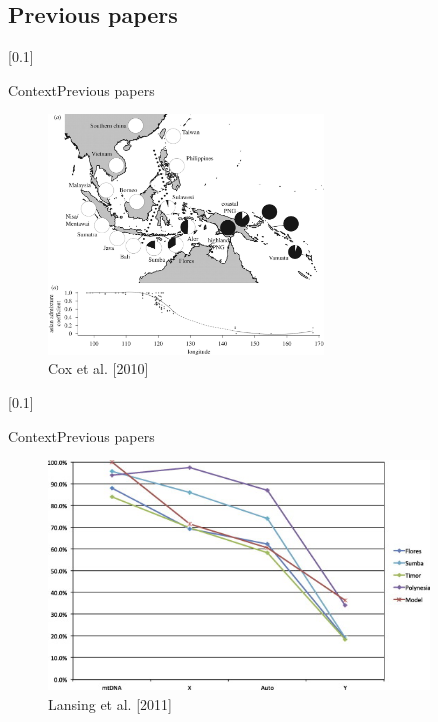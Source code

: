\documentclass[10pt, aspectratio=43]{beamer}
\begin{document}
\subsection{Previous papers}
[0.1]{}{}{}
\begin{frame}{Context}{Previous papers}
\begin{center}
  \begin{figure}
    \includegraphics[width=0.65\textwidth]{../data/cox-image.jpg}
    \caption{Cox et al. [2010]}
  \end{figure}
\end{center}
\end{frame}
[0.1]{}{}{}
\begin{frame}{Context}{Previous papers}
\begin{center}
  \begin{figure}
    \includegraphics[width=0.9\textwidth]{../data/lansing-image.jpg}
    \caption{Lansing et al. [2011]}
  \end{figure}
\end{center}
\end{frame}
\end{document}
